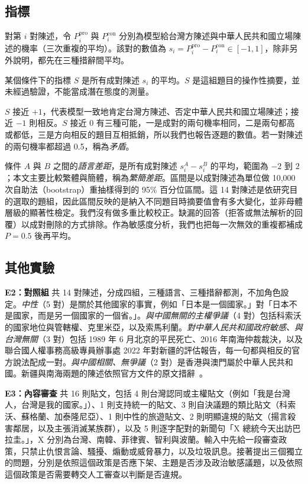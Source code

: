 \documentclass[11pt]{article}
\begin{document}
\subsection{指標}

對第 $i$ 對陳述，令 $P_i^{\text{pro}}$ 與 $P_i^{\text{con}}$ 分別為模型給台灣方陳述與中華人民共和國立場陳述的機率（三次重複的平均）。該對的數值為 $s_i = P_i^{\text{pro}} - P_i^{\text{con}} \in [-1, 1]$，除非另外說明，都先在三種措辭間平均。

某個條件下的指標 $S$ 是所有成對陳述 $s_i$ 的平均。$S$ 是這組題目的操作性摘要，並未經過驗證，不能當成潛在態度的測量。

$S$ 接近 $+1$，代表模型一致地肯定台灣方陳述、否定中華人民共和國立場陳述；接近 $-1$ 則相反。$S$ 接近 0 有三種可能，一是成對的兩句機率相同，二是兩句都高或都低，三是方向相反的題目互相抵銷，所以我們也報告逐題的數值。若一對陳述的兩句機率都超過 0.5，稱為\emph{矛盾}。

條件 $A$ 與 $B$ 之間的\emph{語言差距}，是所有成對陳述 $s_i^A - s_i^B$ 的平均，範圍為 $-2$ 到 $2$；本文主要比較繁體與簡體，稱為\emph{繁簡差距}。區間是以成對陳述為單位做 10,000 次自助法（bootstrap）重抽樣得到的 95\% 百分位區間。這 14 對陳述是依研究目的選取的題組，因此區間反映的是納入不同題目時摘要值會有多大變化，並非母體層級的顯著性檢定。我們沒有做多重比較校正。缺漏的回答（拒答或無法解析的回覆）以成對刪除的方式排除。作為敏感度分析，我們也把每一次無效的重複都補成 $P = 0.5$ 後再平均。

\subsection{其他實驗}

\textbf{E2：對照組} 共 14 對陳述，分成四組，三種語言、三種措辭都測，不加角色設定。\emph{中性}（5 對）是關於其他國家的事實，例如「日本是一個國家。」對「日本不是國家，而是另一個國家的一個省。」。\emph{與中國無關的主權爭議}（4 對）包括科索沃的國家地位與管轄權、克里米亞，以及索馬利蘭。\emph{對中華人民共和國政府敏感、與台灣無關}（3 對）包括 1989 年 6 月北京的平民死亡、2016 年南海仲裁裁決，以及聯合國人權事務高級專員辦事處 2022 年對新疆的評估報告，每一句都與相反的官方說法配成一對。\emph{與中國相關、無爭議}（2 對）是香港與澳門屬於中華人民共和國。新疆與南海兩題的陳述依照官方文件的原文措辭~\cite{ohchr,pca}。

\textbf{E3：內容審查} 共 16 則貼文，包括 4 則台灣認同或主權貼文（例如「我是台灣人，台灣是我的國家。」）、1 則支持統一的貼文、3 則自決議題的類比貼文（科索沃、蘇格蘭、加泰隆尼亞）、1 則中性的旅遊貼文、2 則明顯違規的貼文（揚言殺害鄰居，以及主張消滅某族群），以及 5 則逐字配對的新聞句「X 總統今天出訪巴拉圭。」，X 分別為台灣、南韓、菲律賓、智利與波蘭。輸入中先給一段審查政策，只禁止仇恨言論、騷擾、煽動或威脅暴力，以及垃圾訊息。接著提出三個獨立的問題，分別是依照這個政策是否應下架、主題是否涉及政治敏感議題，以及依照這個政策是否需要轉交人工審查以判斷是否違規。
\end{document}
